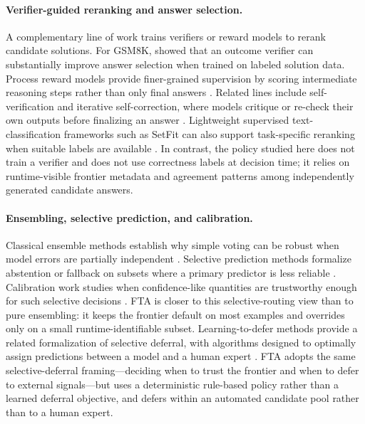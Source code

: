 \paragraph{Verifier-guided reranking and answer selection.}
A complementary line of work trains verifiers or reward models to rerank candidate solutions.
For GSM8K, \citet{cobbe2021training} showed that an outcome verifier can substantially improve answer selection when trained on labeled solution data.
Process reward models provide finer-grained supervision by scoring intermediate reasoning steps rather than only final answers \citep{lightman2024lets}.
Related lines include self-verification and iterative self-correction, where models critique or re-check their own outputs before finalizing an answer \citep{weng2023largelanguagemodelsbetter,madaan2023selfrefine}.
Lightweight supervised text-classification frameworks such as SetFit can also support task-specific reranking when suitable labels are available \citep{tunstall2022efficient}.
In contrast, the policy studied here does not train a verifier and does not use correctness labels at decision time; it relies on runtime-visible frontier metadata and agreement patterns among independently generated candidate answers.

\paragraph{Ensembling, selective prediction, and calibration.}
Classical ensemble methods establish why simple voting can be robust when model errors are partially independent \citep{dietterich2000ensemble}.
Selective prediction methods formalize abstention or fallback on subsets where a primary predictor is less reliable \citep{geifman2017selectiveclassificationdeepneural}.
Calibration work studies when confidence-like quantities are trustworthy enough for such selective decisions \citep{guo2017calibrationmodernneuralnetworks}.
FTA is closer to this selective-routing view than to pure ensembling: it keeps the frontier default on most examples and overrides only on a small runtime-identifiable subset.
Learning-to-defer methods provide a related formalization of selective deferral, with algorithms designed to optimally assign predictions between a model and a human expert \citep{mozannar2023who,mao2023defer}.
FTA adopts the same selective-deferral framing---deciding when to trust the frontier and when to defer to external signals---but uses a deterministic rule-based policy rather than a learned deferral objective, and defers within an automated candidate pool rather than to a human expert.

